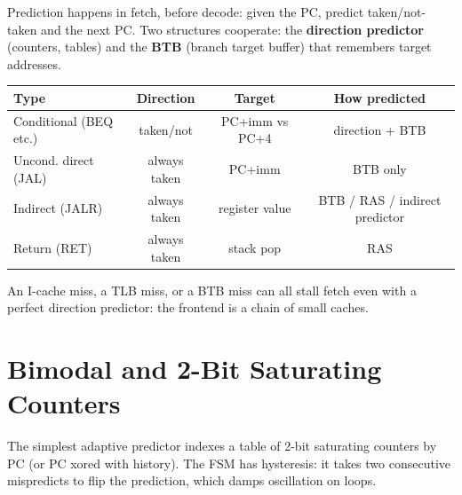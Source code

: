 Prediction happens in fetch, before decode: given the PC, predict taken/not-taken and the next PC. Two structures cooperate: the \textbf{direction predictor} (counters, tables) and the \textbf{BTB} (branch target buffer) that remembers target addresses.

\begin{center}
\begin{tabular}{lccc}
\toprule Type & Direction & Target & How predicted \\ \midrule
Conditional (BEQ etc.) & taken/not & PC+imm vs PC+4 & direction + BTB \\
Uncond. direct (JAL) & always taken & PC+imm & BTB only \\
Indirect (JALR) & always taken & register value & BTB / RAS / indirect predictor \\
Return (RET) & always taken & stack pop & RAS \\ \bottomrule
\end{tabular}
\end{center}
An I-cache miss, a TLB miss, or a BTB miss can all stall fetch even with a perfect direction predictor: the frontend is a chain of small caches.

\section{Bimodal and 2-Bit Saturating Counters}
The simplest adaptive predictor indexes a table of 2-bit saturating counters by PC (or PC xored with history). The FSM has hysteresis: it takes two consecutive mispredicts to flip the prediction, which damps oscillation on loops.

